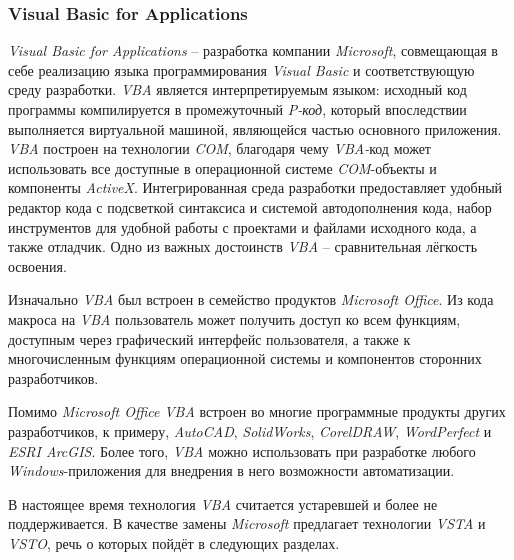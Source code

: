 \subsubsection{Visual Basic for Applications}

{\it Visual Basic for Applications} -- разработка компании {\it Microsoft}, совмещающая в себе реализацию языка программирования {\it Visual Basic} и соответствующую среду разработки. {\it VBA} является интерпретируемым языком: исходный код программы компилируется в промежуточный {\it P-код}, который впоследствии выполняется виртуальной машиной, являющейся частью основного приложения. {\it VBA} построен на технологии {\it COM}, благодаря чему {\it VBA-}код может использовать все доступные в операционной системе {\it COM}-объекты и компоненты {\it ActiveX}. Интегрированная среда разработки предоставляет удобный редактор кода с подсветкой синтаксиса и системой автодополнения кода, набор инструментов для удобной работы с проектами и файлами исходного кода, а также отладчик. Одно из важных достоинств {\it VBA} -- сравнительная лёгкость освоения.

Изначально {\it VBA} был встроен в семейство продуктов {\it Microsoft Office}. Из кода макроса на {\it VBA} пользователь может получить доступ ко всем функциям, доступным через графический интерфейс пользователя, а также к многочисленным функциям операционной системы и компонентов сторонних разработчиков.

Помимо {\it Microsoft Office} {\it VBA} встроен во многие программные продукты других разработчиков, к примеру,  {\it AutoCAD}, {\it SolidWorks}, {\it CorelDRAW}, {\it WordPerfect} и {\it ESRI ArcGIS}. Более того, {\it VBA} можно использовать при разработке любого {\it Windows}-приложения для внедрения в него возможности автоматизации. 

В настоящее время технология {\it VBA} считается устаревшей и более не поддерживается. В качестве замены {\it Microsoft} предлагает технологии {\it VSTA} и {\it VSTO}, речь о которых пойдёт в следующих разделах.